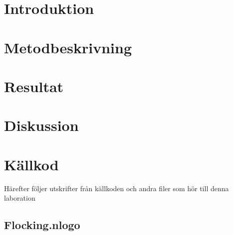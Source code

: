 \documentclass[titlepage, a4paper, 12pt]{article}
\begin{document}
\section{Introduktion}

\section{Metodbeskrivning}

\section{Resultat}
\section{Diskussion}




\newpage
\appendix
{}
\section{Källkod}\label{sec:kallkod}
Härefter följer utskrifter från källkoden och andra filer som hör till
denna laboration

\subsection{Flocking.nlogo}\label{app:Flocking.nlogo}
\begin{footnotesize}
  
\end{footnotesize}
\end{document}
